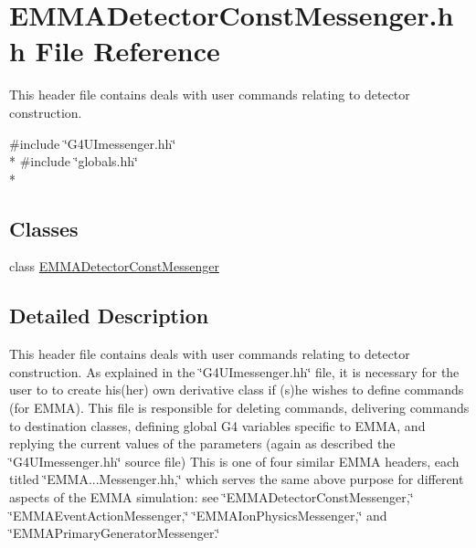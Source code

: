 \hypertarget{EMMADetectorConstMessenger_8hh}{\section{E\-M\-M\-A\-Detector\-Const\-Messenger.\-hh File Reference}
\label{EMMADetectorConstMessenger_8hh}
}


This header file contains deals with user commands relating to detector construction.  


{\ttfamily \#include \char`\"{}G4\-U\-Imessenger.\-hh\char`\"{}}\\*
{\ttfamily \#include \char`\"{}globals.\-hh\char`\"{}}\\*
\subsection*{Classes}
\begin{DoxyCompactItemize}
\item 
class \hyperlink{classEMMADetectorConstMessenger}{E\-M\-M\-A\-Detector\-Const\-Messenger}
\end{DoxyCompactItemize}


\subsection{Detailed Description}
This header file contains deals with user commands relating to detector construction. As explained in the \char`\"{}\-G4\-U\-Imessenger.\-hh\char`\"{} file, it is necessary for the user to to create his(her) own derivative class if (s)he wishes to define commands (for E\-M\-M\-A). This file is responsible for deleting commands, delivering commands to destination classes, defining global G4 variables specific to E\-M\-M\-A, and replying the current values of the parameters (again as described the \char`\"{}\-G4\-U\-Imessenger.\-hh\char`\"{} source file) This is one of four similar E\-M\-M\-A headers, each titled \char`\"{}\-E\-M\-M\-A...\-Messenger.\-hh,\char`\"{} which serves the same above purpose for different aspects of the E\-M\-M\-A simulation\-: see \char`\"{}\-E\-M\-M\-A\-Detector\-Const\-Messenger,\char`\"{} \char`\"{}\-E\-M\-M\-A\-Event\-Action\-Messenger,\char`\"{} \char`\"{}\-E\-M\-M\-A\-Ion\-Physics\-Messenger,\char`\"{} and \char`\"{}\-E\-M\-M\-A\-Primary\-Generator\-Messenger.\char`\"{} 
